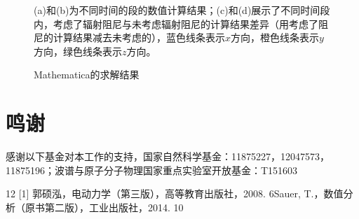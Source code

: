 \documentclass{article} %
\begin{document}
\begin{figure}[t]
\begin{center}
  \end{center}
  \quad (a)和(b)为不同时间的段的数值计算结果；(c)和(d)展示了不同时间段内，考虑了辐射阻尼与未考虑辐射阻尼的计算结果差异（用考虑了阻尼的计算结果减去未考虑的），蓝色线条表示$x$方向，橙色线条表示$y$方向，绿色线条表示$z$方向。
  \caption{Mathematica的求解结果}
  \label{P2}
\end{figure}
\section{鸣谢}
感谢以下基金对本工作的支持，国家自然科学基金：11875227，12047573，11875196；波谱与原子分子物理国家重点实验室开放基金：T151603
\begin{thebibliography}{12}
  [1] 郭硕泓，电动力学（第三版），高等教育出版社，2008. 6\newline
  [2] Sauer, T.，数值分析（原书第二版），工业出版社，2014. 10
\end{thebibliography}
\end{document}
